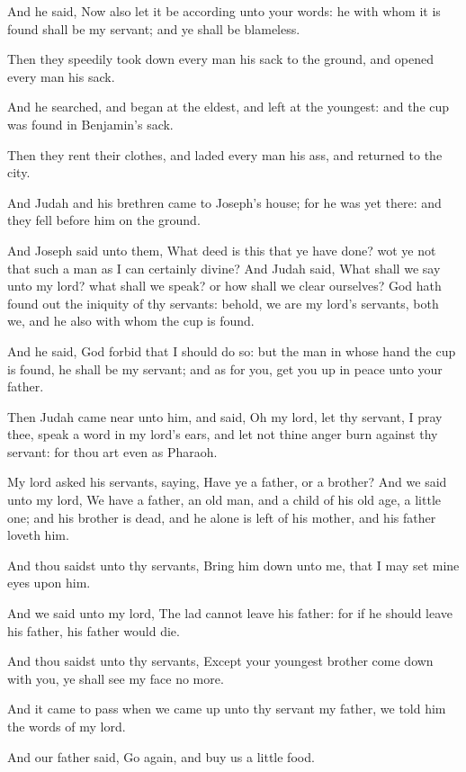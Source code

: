\verse And he said, Now also let it be according unto your words: he
with whom it is found shall be my servant; and ye shall be blameless.

\verse Then they speedily took down every man his sack to the ground,
and opened every man his sack.

\verse And he searched, and began at the eldest, and left at the
youngest: and the cup was found in Benjamin's sack.

\verse Then they rent their clothes, and laded every man his ass, and
returned to the city.

\verse And Judah and his brethren came to Joseph's house; for he was
yet there: and they fell before him on the ground.

\verse And Joseph said unto them, What deed is this that ye have done?
wot ye not that such a man as I can certainly divine?  \verse And Judah
said, What shall we say unto my lord? what shall we speak?  or how
shall we clear ourselves? God hath found out the iniquity of thy
servants: behold, we are my lord's servants, both we, and he also with
whom the cup is found.

\verse And he said, God forbid that I should do so: but the man in
whose hand the cup is found, he shall be my servant; and as for you,
get you up in peace unto your father.

\verse Then Judah came near unto him, and said, Oh my lord, let thy
servant, I pray thee, speak a word in my lord's ears, and let not
thine anger burn against thy servant: for thou art even as Pharaoh.

\verse My lord asked his servants, saying, Have ye a father, or a
brother?  \verse And we said unto my lord, We have a father, an old
man, and a child of his old age, a little one; and his brother is
dead, and he alone is left of his mother, and his father loveth him.

\verse And thou saidst unto thy servants, Bring him down unto me, that
I may set mine eyes upon him.

\verse And we said unto my lord, The lad cannot leave his father: for
if he should leave his father, his father would die.

\verse And thou saidst unto thy servants, Except your youngest brother
come down with you, ye shall see my face no more.

\verse And it came to pass when we came up unto thy servant my father,
we told him the words of my lord.

\verse And our father said, Go again, and buy us a little food.

